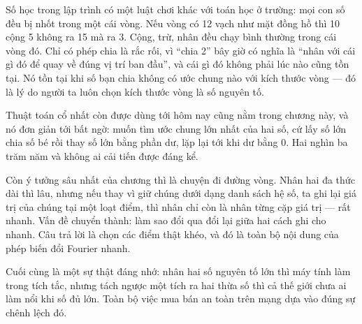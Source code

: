 \documentclass[../../algorithm.tex]{subfiles}
\begin{document}
\begin{dongian}
Số học trong lập trình có một luật chơi khác với toán học ở trường: mọi con số đều bị nhốt trong một cái vòng. Nếu vòng có 12 vạch như mặt đồng hồ thì 10 cộng 5 không ra 15 mà ra 3. Cộng, trừ, nhân đều chạy bình thường trong cái vòng đó. Chỉ có phép chia là rắc rối, vì ``chia 2'' bây giờ có nghĩa là ``nhân với cái gì đó để quay về đúng vị trí ban đầu'', và cái gì đó không phải lúc nào cũng tồn tại. Nó tồn tại khi số bạn chia không có ước chung nào với kích thước vòng --- đó là lý do người ta luôn chọn kích thước vòng là số nguyên tố.

Thuật toán cổ nhất còn được dùng tới hôm nay cũng nằm trong chương này, và nó đơn giản tới bất ngờ: muốn tìm ước chung lớn nhất của hai số, cứ lấy số lớn chia số bé rồi thay số lớn bằng phần dư, lặp lại tới khi dư bằng 0. Hai nghìn ba trăm năm và không ai cải tiến được đáng kể.

Còn ý tưởng sâu nhất của chương thì là chuyện đi đường vòng. Nhân hai đa thức dài thì lâu, nhưng nếu thay vì giữ chúng dưới dạng danh sách hệ số, ta ghi lại giá trị của chúng tại một loạt điểm, thì nhân chỉ còn là nhân từng cặp giá trị --- rất nhanh. Vấn đề chuyển thành: làm sao đổi qua đổi lại giữa hai cách ghi cho nhanh. Câu trả lời là chọn các điểm thật khéo, và đó là toàn bộ nội dung của phép biến đổi Fourier nhanh.

Cuối cùng là một sự thật đáng nhớ: nhân hai số nguyên tố lớn thì máy tính làm trong tích tắc, nhưng tách ngược một tích ra hai thừa số thì cả thế giới chưa ai làm nổi khi số đủ lớn. Toàn bộ việc mua bán an toàn trên mạng dựa vào đúng sự chênh lệch đó.
\end{dongian}
\end{document}
